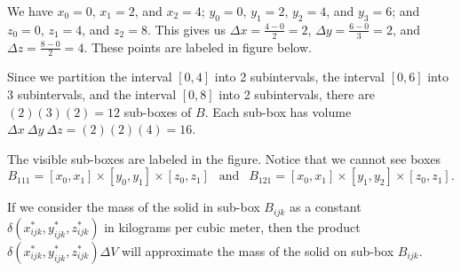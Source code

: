 \begin{activitySolution}

    \ba
    \item We have $x_0=0$, $x_1=2$, and $x_2=4$;  $y_0=0$, $y_1=2$, $y_2=4$, and $y_3=6$; and $z_0=0$, $z_1=4$, and $z_2=8$. This gives us $\Delta x = \frac{4-0}{2} = 2$, $\Delta y = \frac{6-0}{3} = 2$, and $\Delta z = \frac{8-0}{2} = 4$.  These points are labeled in figure below.

\begin{center}
\end{center}


	\item Since we partition the interval $[0,4]$ into 2 subintervals, the interval $[0,6]$ into 3 subintervals, and the interval $[0,8]$ into 2 subintervals, there are $(2)(3)(2) = 12$ sub-boxes of $B$.  Each sub-box has volume $\Delta x \ \Delta y \ \Delta z = (2)(2)(4) = 16$.

	
	\item The visible sub-boxes are labeled in the figure. Notice that we cannot see boxes
\[B_{111} = [x_0,x_1] \times [y_0, y_1] \times [z_0,z_1] \ \ \text{ and } \ \ B_{121} = [x_0,x_1] \times [y_1, y_2] \times [z_0,z_1].\]

If we consider the mass of the solid in sub-box $B_{ijk}$ as a constant $\delta(x_{ijk}^*, y_{ijk}^*, z_{ijk}^*)$ in kilograms per cubic meter, then the product $\delta(x_{ijk}^*, y_{ijk}^*, z_{ijk}^*) \Delta V$ will approximate the mass of the solid on sub-box $B_{ijk}$.



\end{activitySolution}
